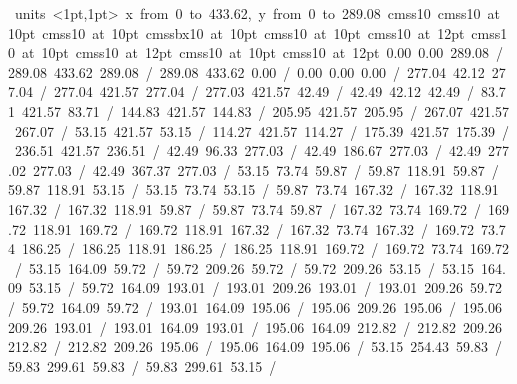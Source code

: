 \hbox{\beginpicture
\setcoordinatesystem units <1pt,1pt>
\setplotarea x from 0 to 433.62, y from 0 to 289.08
\setlinear
\font\picfont cmss10\picfont
\font\picfont cmss10 at 10pt\picfont
\font\picfont cmss10 at 10pt\picfont
\font\picfont cmssbx10 at 10pt\picfont
\font\picfont cmss10 at 10pt\picfont
\font\picfont cmss10 at 12pt\picfont
\font\picfont cmss10 at 10pt\picfont
\font\picfont cmss10 at 12pt\picfont
\font\picfont cmss10 at 10pt\picfont
\font\picfont cmss10 at 12pt\picfont
\setsolid
{} 0.00 0.00 289.08 /
 289.08 433.62 289.08 /
 289.08 433.62 0.00 /
 0.00 0.00 0.00 /
\setsolid
{} 277.04 42.12 277.04 /
 277.04 421.57 277.04 /
 277.03 421.57 42.49 /
 42.49 42.12 42.49 /
\setsolid
{} 83.71 421.57 83.71 /
\setsolid
{} 144.83 421.57 144.83 /
\setsolid
{} 205.95 421.57 205.95 /
\setsolid
{} 267.07 421.57 267.07 /
\setsolid
{} 53.15 421.57 53.15 /
\setsolid
{} 114.27 421.57 114.27 /
\setsolid
{} 175.39 421.57 175.39 /
\setsolid
{} 236.51 421.57 236.51 /
\setsolid
{} 42.49 96.33 277.03 /
\setsolid
{} 42.49 186.67 277.03 /
\setsolid
{} 42.49 277.02 277.03 /
\setsolid
{} 42.49 367.37 277.03 /
\setsolid
{} 53.15 73.74 59.87 /
 59.87 118.91 59.87 /
 59.87 118.91 53.15 /
 53.15 73.74 53.15 /
\setsolid
{} 59.87 73.74 167.32 /
 167.32 118.91 167.32 /
 167.32 118.91 59.87 /
 59.87 73.74 59.87 /
\setsolid
{} 167.32 73.74 169.72 /
 169.72 118.91 169.72 /
 169.72 118.91 167.32 /
 167.32 73.74 167.32 /
\setsolid
{} 169.72 73.74 186.25 /
 186.25 118.91 186.25 /
 186.25 118.91 169.72 /
 169.72 73.74 169.72 /
\setsolid
{} 53.15 164.09 59.72 /
 59.72 209.26 59.72 /
 59.72 209.26 53.15 /
 53.15 164.09 53.15 /
\setsolid
{} 59.72 164.09 193.01 /
 193.01 209.26 193.01 /
 193.01 209.26 59.72 /
 59.72 164.09 59.72 /
\setsolid
{} 193.01 164.09 195.06 /
 195.06 209.26 195.06 /
 195.06 209.26 193.01 /
 193.01 164.09 193.01 /
\setsolid
{} 195.06 164.09 212.82 /
 212.82 209.26 212.82 /
 212.82 209.26 195.06 /
 195.06 164.09 195.06 /
\setsolid
{} 53.15 254.43 59.83 /
 59.83 299.61 59.83 /
 59.83 299.61 53.15 /
}
